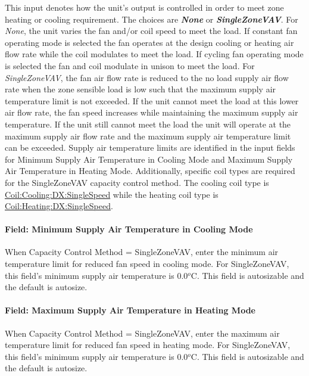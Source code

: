 This input denotes how the unit's output is controlled in order to meet zone heating or cooling requirement. The choices are \textbf{\emph{None}} or \textbf{\emph{SingleZoneVAV}}. For \emph{None}, the unit varies the fan and/or coil speed to meet the load. If constant fan operating mode is selected the fan operates at the design cooling or heating air flow rate while the coil modulates to meet the load. If cycling fan operating mode is selected the fan and coil modulate in unison to meet the load. For \emph{SingleZoneVAV}, the fan air flow rate is reduced to the no load supply air flow rate when the zone sensible load is low such that the maximum supply air temperature limit is not exceeded. If the unit cannot meet the load at this lower air flow rate, the fan speed increases while maintaining the maximum supply air temperature. If the unit still cannot meet the load the unit will operate at the maximum supply air flow rate and the maximum supply air temperature limit can be exceeded. Supply air temperature limits are identified in the input fields for Minimum Supply Air Temperature in Cooling Mode and Maximum Supply Air Temperature in Heating Mode. Additionally, specific coil types are required for the SingleZoneVAV capacity control method. The cooling coil type is \hyperref[coilcoolingdxsinglespeed]{Coil:Cooling:DX:SingleSpeed} while the heating coil type is \hyperref[coilheatingdxsinglespeed]{Coil:Heating:DX:SingleSpeed}.

\paragraph{Field: Minimum Supply Air Temperature in Cooling Mode}\label{field-minimum-supply-air-temperature-in-cooling-mode-3}

When Capacity Control Method = SingleZoneVAV, enter the minimum air temperature limit for reduced fan speed in cooling mode. For SingleZoneVAV, this field's minimum supply air temperature is 0.0\(^{o}\)C. This field is autosizable and the default is autosize.

\paragraph{Field: Maximum Supply Air Temperature in Heating Mode}\label{field-maximum-supply-air-temperature-in-heating-mode-3}

When Capacity Control Method = SingleZoneVAV, enter the maximum air temperature limit for reduced fan speed in heating mode. For SingleZoneVAV, this field's minimum supply air temperature is 0.0\(^{o}\)C. This field is autosizable and the default is autosize.


